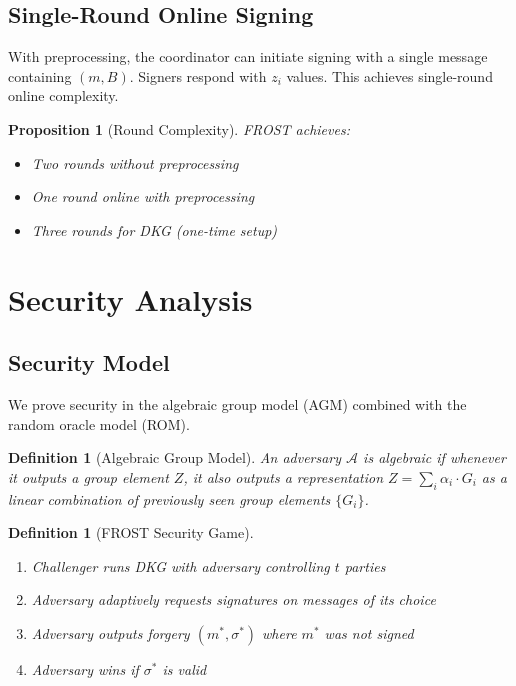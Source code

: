 \documentclass[11pt,a4paper]{article}
\newtheorem{definition}[theorem]{Definition}
\newtheorem{proposition}[theorem]{Proposition}
\begin{document}
\subsection{Single-Round Online Signing}

With preprocessing, the coordinator can initiate signing with a single message containing $(m, B)$. Signers respond with $z_i$ values. This achieves single-round online complexity.

\begin{proposition}[Round Complexity]
FROST achieves:
\begin{itemize}
    \item Two rounds without preprocessing
    \item One round online with preprocessing
    \item Three rounds for DKG (one-time setup)
\end{itemize}
\end{proposition}

\section{Security Analysis}

\subsection{Security Model}

We prove security in the algebraic group model (AGM) combined with the random oracle model (ROM).

\begin{definition}[Algebraic Group Model]
An adversary $\mathcal{A}$ is algebraic if whenever it outputs a group element $Z$, it also outputs a representation $Z = \sum_i \alpha_i \cdot G_i$ as a linear combination of previously seen group elements $\{G_i\}$.
\end{definition}

\begin{definition}[FROST Security Game]
\begin{enumerate}
    \item Challenger runs DKG with adversary controlling $t$ parties
    \item Adversary adaptively requests signatures on messages of its choice
    \item Adversary outputs forgery $(m^*, \sigma^*)$ where $m^*$ was not signed
    \item Adversary wins if $\sigma^*$ is valid
\end{enumerate}
\end{definition}
\end{document}
